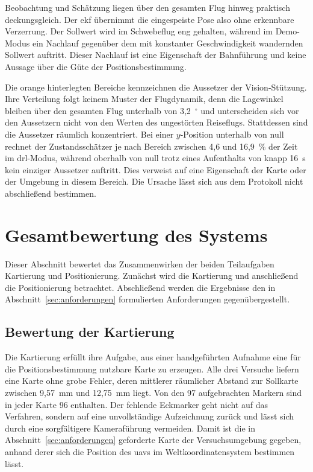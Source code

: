 Beobachtung und Schätzung liegen über den gesamten Flug hinweg praktisch deckungsgleich.
Der \gls{ekf} übernimmt die eingespeiste Pose also ohne erkennbare Verzerrung.
Der Sollwert wird im Schwebeflug eng gehalten, während im Demo-Modus ein Nachlauf gegenüber dem mit konstanter Geschwindigkeit wandernden Sollwert auftritt.
Dieser Nachlauf ist eine Eigenschaft der Bahnführung und keine Aussage über die Güte der Positionsbestimmung.

Die orange hinterlegten Bereiche kennzeichnen die Aussetzer der Vision-Stützung.
Ihre Verteilung folgt keinem Muster der Flugdynamik, denn die Lagewinkel bleiben über den gesamten Flug unterhalb von 3,2~$^\circ$ und unterscheiden sich vor den Aussetzern nicht von den Werten des ungestörten Reiseflugs.
Stattdessen sind die Aussetzer räumlich konzentriert.
Bei einer $y$-Position unterhalb von null rechnet der Zustandsschätzer je nach Bereich zwischen 4,6 und 16,9~\% der Zeit im \gls{drl}-Modus, während oberhalb von null trotz eines Aufenthalts von knapp 16~s kein einziger Aussetzer auftritt.
Dies verweist auf eine Eigenschaft der Karte oder der Umgebung in diesem Bereich.
Die Ursache lässt sich aus dem Protokoll nicht abschließend bestimmen.







\section{Gesamtbewertung des Systems}
\label{sec:gesamtbewertung}
Dieser Abschnitt bewertet das Zusammenwirken der beiden Teilaufgaben Kartierung und Positionierung.
Zunächst wird die Kartierung und anschließend die Positionierung betrachtet.
Abschließend werden die Ergebnisse den in Abschnitt~\ref{sec:anforderungen} formulierten Anforderungen gegenübergestellt.

\subsection*{Bewertung der Kartierung}
\label{subsec:bewertung_kartierung}
Die Kartierung erfüllt ihre Aufgabe, aus einer handgeführten Aufnahme eine für die Positionsbestimmung nutzbare Karte zu erzeugen.
Alle drei Versuche liefern eine Karte ohne grobe Fehler, deren mittlerer räumlicher Abstand zur Sollkarte zwischen 9,57~mm und 12,75~mm liegt.
Von den 97 aufgebrachten Markern sind in jeder Karte 96 enthalten.
Der fehlende Eckmarker geht nicht auf das Verfahren, sondern auf eine unvollständige Aufzeichnung zurück und lässt sich durch eine sorgfältigere Kameraführung vermeiden.
Damit ist die in Abschnitt~\ref{sec:anforderungen} geforderte Karte der Versuchsumgebung gegeben, anhand derer sich die Position des \gls{uav}s im Weltkoordinatensystem bestimmen lässt.


